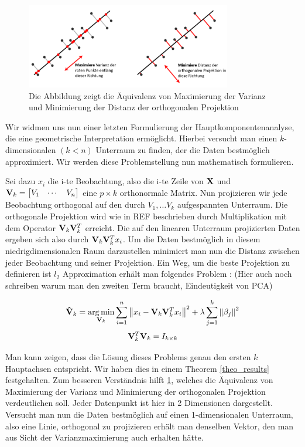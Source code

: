 \begin{figure}
\centering
\includegraphics[width = 0.8\textwidth]{figures/pca_projection_explanation_german.png}
\caption{Die Abbildung zeigt die Äquivalenz von Maximierung der Varianz und Minimierung der Distanz der orthogonalen Projektion}
\label{pca_projection_explanation}
\end{figure}

Wir widmen uns nun einer letzten Formulierung der Hauptkomponentenanalyse, die eine geometrische Interpretation ermöglicht. Hierbei versucht man einen $k$-dimensionalen $(k < n)$ Unterraum zu finden, der die Daten bestmöglich approximiert. Wir werden diese Problemstellung nun mathematisch formulieren.

Sei dazu $x_i$ die i-te Beobachtung, also die i-te Zeile von $\mathbf{X}$ und $\mathbf{V}_k = \begin{bmatrix} V_1 & \cdots & V_n \end{bmatrix}$ eine $p \times k$ orthonormale Matrix. Nun projizieren wir jede Beobachtung orthogonal auf den durch $V_1, \ldots V_k$ aufgespannten Unterraum. Die orthogonale Projektion wird wie in REF beschrieben durch Multiplikation mit dem Operator $\mathbf{V}_k \mathbf{V}_k^T$ erreicht. Die auf den linearen Unterraum projizierten Daten ergeben sich also durch $\mathbf{V}_k \mathbf{V}_k^T x_i$. Um die Daten bestmöglich in diesem niedrigdimensionalen Raum darzustellen minimiert man nun die Distanz zwischen jeder Beobachtung und seiner Projektion. Ein Weg, um die beste Projektion zu definieren ist $l_2$ Approximation erhält man folgendes Problem \cite{zou_sparsepca}: (Hier auch noch schreiben warum man den zweiten Term braucht, Eindeutigkeit von PCA)

$$\mathbf{\hat{V}}_k = \operatorname*{arg\,min}_{\mathbf{V}_k} \sum_{i=1}^{n} \left\lVert x_i - \mathbf{V}_k \mathbf{V}_k^Tx_i \right\rVert^2 + \lambda \sum_{j=1}^{k}\left\lVert \beta_j \right\rVert^2$$
$$\mathbf{V}_k^T\mathbf{V}_k = I_{k \times k}$$

Man kann zeigen, dass die Lösung dieses Problems genau den ersten $k$ Hauptachsen entspricht. Wir haben dies in einem Theorem \ref{theo_results} festgehalten.  \cite{vidal} Zum besseren Verständnis hilft \ref{pca_projection_explanation}, welches die Äquivalenz von Maximierung der Varianz und Minimierung der orthogonalen Projektion verdeutlichen soll. Jeder Datenpunkt ist hier in 2 Dimensionen dargestellt. Versucht man nun die Daten bestmöglich auf einen 1-dimensionalen Unterraum, also eine Linie, orthogonal zu projizieren erhält man denselben Vektor, den man aus Sicht der Varianzmaximierung auch erhalten hätte. 

